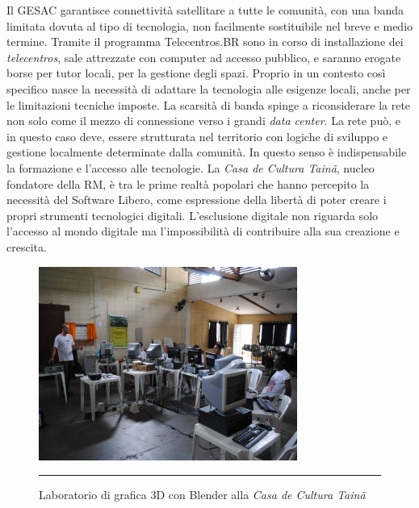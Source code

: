 Il GESAC garantisce connettività satellitare a tutte le comunità, con
una banda limitata dovuta al tipo di tecnologia, non facilmente
sostituibile nel breve e medio termine. Tramite il programma
Telecentros.BR sono in corso di installazione dei \emph{telecentros},
sale attrezzate con computer ad accesso pubblico, e saranno erogate
borse per tutor locali, per la gestione degli spazi. Proprio in un
contesto così specifico nasce la necessità di adattare la tecnologia
alle esigenze locali, anche per le limitazioni tecniche imposte. La
scarsità di banda spinge a riconsiderare la rete non solo come il
mezzo di connessione verso i grandi \emph{data center}. La rete può, e
in questo caso deve, essere strutturata nel territorio con logiche di
sviluppo e gestione localmente determinate dalla comunità. In questo
senso è indispensabile la formazione e l'accesso alle tecnologie. La
\emph{Casa de Cultura Tainã}, nucleo fondatore della RM, è tra le
prime realtà popolari che hanno percepito la necessità del Software
Libero, come espressione della libertà di poter creare i propri
strumenti tecnologici digitali. L'esclusione digitale non riguarda
solo l'accesso al mondo digitale ma l'impossibilità di contribuire
alla sua creazione e crescita.

\begin{figure}[htbp]
  \centering
  \includegraphics[width=\textwidth]{./Figure/taina_oficina.pdf}
  \rule{35em}{0.5pt}
  \caption[Laboratorio di grafica 3D con Blender alla \emph{Casa de
    Cultura Tainã}]{Laboratorio di grafica 3D con Blender alla
    \emph{Casa de Cultura Tainã}}
  \label{fig:oficinaBlender}
\end{figure}

